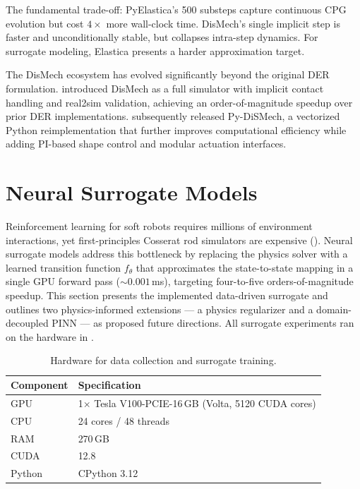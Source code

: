 \documentclass[11pt]{article}
\begin{document}
The fundamental trade-off: PyElastica's 500 substeps capture continuous CPG evolution but cost $4\times$ more wall-clock time.
DisMech's single implicit step is faster and unconditionally stable, but collapses intra-step dynamics.
For surrogate modeling, Elastica presents a harder approximation target.

The DisMech ecosystem has evolved significantly beyond the original DER formulation.
\citet{Choi2024dismech} introduced DisMech as a full simulator with implicit contact handling and real2sim validation, achieving an order-of-magnitude speedup over prior DER implementations.
\citet{Lahoti2025pydismech} subsequently released Py-DiSMech, a vectorized Python reimplementation that further improves computational efficiency while adding PI-based shape control and modular actuation interfaces.

\section{Neural Surrogate Models}
\label{sec:surrogate}

Reinforcement learning for soft robots requires millions of environment interactions, yet first-principles Cosserat rod simulators are expensive ().
Neural surrogate models address this bottleneck by replacing the physics solver with a learned transition function $f_\theta$ that approximates the state-to-state mapping in a single GPU forward pass (${\sim}0.001$\,ms), targeting four-to-five orders-of-magnitude speedup.
This section presents the implemented data-driven surrogate and outlines two physics-informed extensions --- a physics regularizer and a domain-decoupled PINN --- as proposed future directions.
All surrogate experiments ran on the hardware in .

\begin{table}[H]
  \centering
  \small
  \renewcommand{\arraystretch}{1.3}
  \caption{Hardware for data collection and surrogate training.}
  \label{tab:hardware-surrogate}
  \begin{tabular}{@{}ll@{}}
    \toprule
    \textbf{Component} & \textbf{Specification} \\
    \midrule
    GPU          & 1$\times$ Tesla V100-PCIE-16\,GB (Volta, 5120 CUDA cores) \\
    CPU          & 24 cores / 48 threads \\
    RAM          & 270\,GB \\
    CUDA         & 12.8 \\
    Python       & CPython 3.12 \\
    \bottomrule
  \end{tabular}
\end{table}
\end{document}
